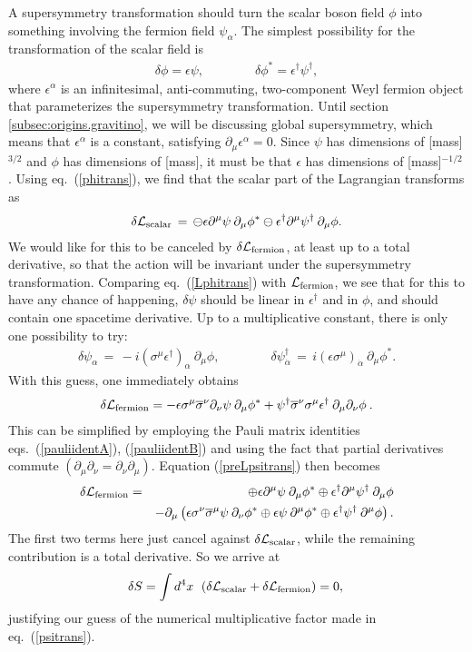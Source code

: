 \documentclass[11pt]{article}
\def\BDpos{}
\def\BDneg{-}
\def\BDplus{+}
\def\BDminus{-}
\def\BDpos{-}
\def\BDneg{}
\def\BDplus{-}
\def\BDminus{+}
\def\BDpos{\oplus}
\def\BDneg{\ominus}
\def\BDplus{\oplus}
\def\BDminus{\ominus}
\def\BDpos{\ominus}
\def\BDneg{\oplus}
\def\BDplus{\ominus}
\def\BDminus{\oplus}
\def\beq{\begin{eqnarray}}
\def\eeq{\end{eqnarray}}
\def\lagr{{\cal L}}
\def\deltaeps{\delta}
\def\sigmabar{\overline\sigma}
\begin{document}
A supersymmetry transformation should turn the scalar boson field $\phi$
into something involving the fermion field $\psi_\alpha$. The simplest
possibility for the transformation of the scalar field is
\beq
\deltaeps \phi = \epsilon \psi,\qquad\qquad
\deltaeps \phi^* = \epsilon^\dagger \psi^\dagger ,
\label{phitrans}
\eeq
where $\epsilon^\alpha$ is an infinitesimal, anti-commuting, two-component
Weyl fermion object that parameterizes the supersymmetry transformation. Until
section \ref{subsec:origins.gravitino}, we will be discussing global
supersymmetry, which means that $\epsilon^\alpha$ is a constant,
satisfying $\partial_\mu \epsilon^\alpha=0$. Since $\psi$ has dimensions
of [mass]$^{3/2}$ and $\phi$ has dimensions of [mass], it must be that
$\epsilon$ has dimensions of [mass]$^{-1/2}$. Using eq.~(\ref{phitrans}),
we find that the scalar part of the Lagrangian transforms as
\beq
\deltaeps
\lagr_{\rm scalar} \,=\, 
\BDpos \epsilon \partial^\mu \psi \> \partial_\mu \phi^*
\BDplus \epsilon^\dagger \partial^\mu \psi^\dagger \> \partial_\mu \phi .
\label{Lphitrans}
\eeq
We would like for this to be canceled by $\deltaeps\lagr_{\rm fermion}$,
at least up to a total derivative, so that the action will be invariant
under the supersymmetry transformation. Comparing eq.~(\ref{Lphitrans})
with $\lagr_{\rm fermion}$, we see that for this to have any chance of
happening, $\deltaeps \psi$ should be linear in $\epsilon^\dagger$ and in
$\phi$, and should contain one spacetime derivative. Up to a
multiplicative constant, there is only one possibility to try:
\beq
\deltaeps\psi_\alpha
\,=\,
- i (\sigma^\mu \epsilon^\dagger)_\alpha\> \partial_\mu \phi,
\qquad\qquad
\deltaeps\psi^\dagger_{\dot{\alpha}}
\,=\,
 i (\epsilon\sigma^\mu)_{\dot{\alpha}}\>   \partial_\mu \phi^* .
\label{psitrans}
\eeq
With this guess, one immediately obtains
\beq
\deltaeps \lagr_{\rm fermion} =
-\epsilon \sigma^\mu \sigmabar^\nu \partial_\nu \psi\> \partial_\mu \phi^*
+\psi^\dagger \sigmabar^\nu \sigma^\mu \epsilon^\dagger \>
\partial_\mu \partial_\nu \phi
\> .
\label{preLpsitrans}
\eeq
This can be simplified by employing the
Pauli matrix identities eqs.~(\ref{pauliidentA}), (\ref{pauliidentB}) 
and using the fact that partial derivatives commute
$(\partial_\mu\partial_\nu = \partial_\nu\partial_\mu)$. Equation
(\ref{preLpsitrans}) then becomes
\beq
\deltaeps \lagr_{\rm fermion} & = &
\BDneg \epsilon\partial^\mu\psi\> \partial_\mu\phi^*
\BDminus \epsilon^\dagger \partial^\mu\psi^\dagger\> \partial_\mu \phi
\nonumber\\ && 
- \partial_\mu \left (
\epsilon \sigma^\nu \sigmabar^\mu \psi \> \partial_\nu \phi^* 
\BDminus \epsilon \psi\> \partial^\mu \phi^*
\BDminus \epsilon^\dagger \psi^\dagger \> \partial^\mu \phi \right ).
\label{Lpsitrans}
\eeq
The first two terms here just cancel against $\deltaeps\lagr_{\rm
scalar}$, while the remaining contribution is a total derivative. So we
arrive at
\beq
\deltaeps S =
\int d^4x \>\>\, (\deltaeps \lagr_{\rm scalar} + \deltaeps
\lagr_{\rm fermion})
= 0,\>
\label{invar}
\eeq
justifying our guess of the numerical multiplicative factor made in
eq.~(\ref{psitrans}). 
\end{document}
